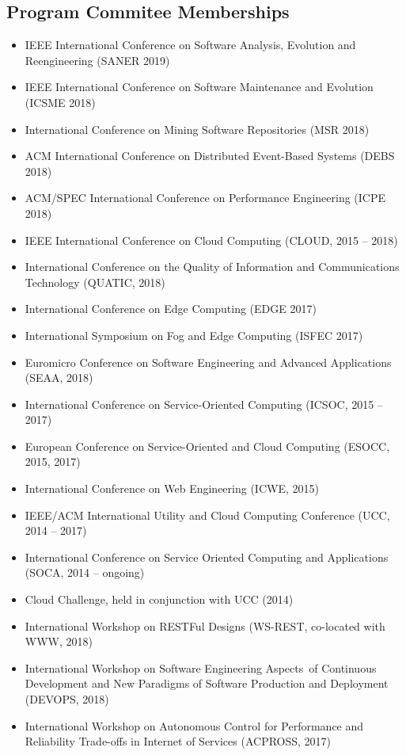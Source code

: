 \documentclass[paper=letter,fontsize=11pt]{scrartcl} %
\begin{document}
\subsection*{Program Commitee Memberships}
\begin{itemize}
	\item IEEE International Conference on Software Analysis, Evolution and Reengineering (SANER 2019)
	\item IEEE International Conference on Software Maintenance and Evolution (ICSME 2018)
	\item International Conference on Mining Software Repositories (MSR 2018)
  \item ACM International Conference on Distributed Event-Based Systems (DEBS 2018)
	\item ACM/SPEC International Conference on Performance Engineering (ICPE 2018)
	\item IEEE International Conference on Cloud Computing (CLOUD, 2015 -- 2018)
	\item International Conference on the Quality of Information and Communications Technology (QUATIC, 2018)
	\item International Conference on Edge Computing (EDGE 2017)
  \item International Symposium on Fog and Edge Computing (ISFEC 2017)
	\item Euromicro Conference on Software Engineering and Advanced Applications (SEAA, 2018)
	\item International Conference on Service-Oriented Computing (ICSOC, 2015 -- 2017)
  \item European Conference on Service-Oriented and Cloud Computing (ESOCC, 2015, 2017)
  \item International Conference on Web Engineering (ICWE, 2015)
  \item IEEE/ACM International Utility and Cloud Computing Conference (UCC, 2014 -- 2017)
  \item International Conference on Service Oriented Computing and Applications (SOCA, 2014 -- ongoing)
	\item Cloud Challenge, held in conjunction with UCC (2014)
	\item International Workshop on RESTFul Designs (WS-REST, co-located with WWW, 2018)
	\item International Workshop on Software Engineering Aspects of Continuous Development and New Paradigms of Software Production and Deployment (DEVOPS, 2018)
  \item International Workshop on Autonomous Control for Performance and Reliability Trade-offs in Internet of Services (ACPROSS, 2017)

\end{itemize}
\end{document}
